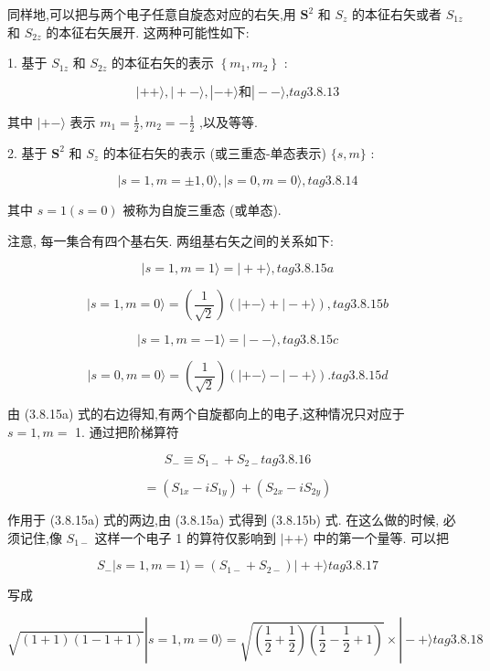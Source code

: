 同样地,可以把与两个电子任意自旋态对应的右矢,用 ${\mathbf{S}}^{2}$ 和 ${S}_{z}$ 的本征右矢或者 ${S}_{1z}$ 和 ${S}_{2z}$ 的本征右矢展开. 这两种可能性如下:

1. 基于 ${S}_{1z}$ 和 ${S}_{2z}$ 的本征右矢的表示 $\left\{ {{m}_{1},{m}_{2}}\right\}$ :

$$
\left| {+ + \rangle ,}\right| + - \rangle ,\left| {- + \rangle \text{和}}\right| - - \rangle \text{,} tag{3.8.13}
$$

其中 $| + - \rangle$ 表示 ${m}_{1} = \frac{1}{2},{m}_{2} = - \frac{1}{2}$ ,以及等等.

2. 基于 ${\mathbf{S}}^{2}$ 和 ${S}_{z}$ 的本征右矢的表示 (或三重态-单态表示) $\{ s, m\}$ :

$$
\left| {s = 1, m = \pm 1,0\rangle ,}\right| s = 0, m = 0\rangle , tag{3.8.14}
$$

其中 $s = 1\left( {s = 0}\right)$ 被称为自旋三重态 (或单态).

注意, 每一集合有四个基右矢. 两组基右矢之间的关系如下:

$$
\left| {s = 1, m = 1\rangle = }\right| + + \rangle , tag{3.8.15a}
$$

$$
|s = 1, m = 0\rangle = \left( \frac{1}{\sqrt{2}}\right) \left( {\left| {+ - \rangle + }\right| - + \rangle }\right) , tag{3.8.15b}
$$

$$
\left| {s = 1, m = - 1\rangle = }\right| - - \rangle , tag{3.8.15c}
$$

$$
|s = 0, m = 0\rangle = \left( \frac{1}{\sqrt{2}}\right) \left( {\left| {+ - \rangle - }\right| - + \rangle }\right) . tag{3.8.15d}
$$

由 (3.8.15a) 式的右边得知,有两个自旋都向上的电子,这种情况只对应于 $s = 1, m =$ 1. 通过把阶梯算符

$$
{S}_{ - } \equiv {S}_{1 - } + {S}_{2 - } tag{3.8.16}
$$

$$
= \left( {{S}_{1x} - i{S}_{1y}}\right) + \left( {{S}_{2x} - i{S}_{2y}}\right)
$$

作用于 (3.8.15a) 式的两边,由 (3.8.15a) 式得到 (3.8.15b) 式. 在这么做的时候, 必须记住,像 ${S}_{1 - }$ 这样一个电子 1 的算符仅影响到 $| + + \rangle$ 中的第一个量等. 可以把

$$
{S}_{ - }\left| {s = 1, m = 1\rangle = \left( {{S}_{1 - } + {S}_{2 - }}\right) }\right| + + \rangle tag{3.8.17}
$$

写成

$$
\sqrt{\left( {1 + 1}\right) \left( {1 - 1 + 1}\right) }\left| {s = 1, m = 0\rangle = \sqrt{\left( {\frac{1}{2} + \frac{1}{2}}\right) \left( {\frac{1}{2} - \frac{1}{2} + 1}\right) } \times }\right| - + \rangle tag{3.8.18}
$$

